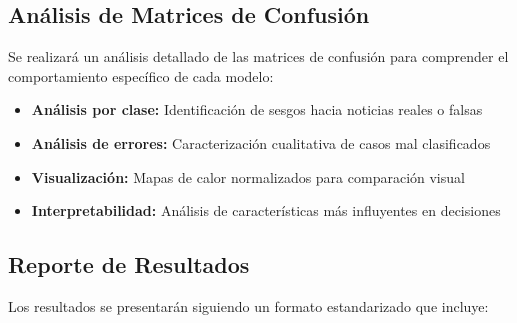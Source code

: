 \subsection{Análisis de Matrices de Confusión}

Se realizará un análisis detallado de las matrices de confusión para comprender el comportamiento específico de cada modelo:

\begin{itemize}
    \item \textbf{Análisis por clase:} Identificación de sesgos hacia noticias reales o falsas
    \item \textbf{Análisis de errores:} Caracterización cualitativa de casos mal clasificados
    \item \textbf{Visualización:} Mapas de calor normalizados para comparación visual
    \item \textbf{Interpretabilidad:} Análisis de características más influyentes en decisiones
\end{itemize}

\subsection{Reporte de Resultados}

Los resultados se presentarán siguiendo un formato estandarizado que incluye:

\begin{table}[htbp]
\centering
{}
\caption{Estructura del reporte de resultados comparativo.}
\label{tab:estructura_reporte}
\end{table}

